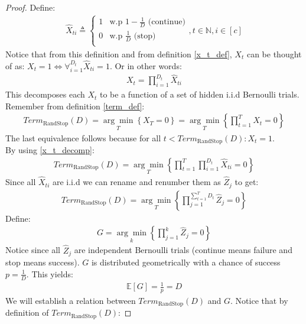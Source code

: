 \documentclass{article}
\newcommand{\E}[1]{\mathbb{E} \left[ #1 \right]}
\newcommand{\argmin}[2]{\underset{#1}{\arg \min} \left\{ #2 \right\}}
\newcommand{\N}{\mathbb{N}}
\newcommand{\termaux}{\textit{Term}_\text{RandStop}}
\begin{document}
\begin{proof}
    Define:
    \begin{gather*}
    \hat{X}_{ti} \triangleq
        \begin{cases}
            1 & \text{w.p } 1 -\frac{1}{D} \text{ (continue)} \\
            0 & \text{w.p } \frac{1}{D} \text{ (stop)} \\
        \end{cases},
        t \in \N, i \in [c]
    \end{gather*}
    Notice that from this definition and from definition \ref{x_t_def}, $X_t$ can be thought of as: $X_t = 1 \iff \forall_{i=1}^{D_t} \hat{X}_{ti} = 1$. Or in other words:
    \begin{gather}\label{x_t_decomp}
        X_t = \prod\limits_{i=1}^{D_t} \hat{X}_{ti}
    \end{gather}
    This decomposes each $X_t$ to be a function of a set of hidden i.i.d Bernoulli trials.
    Remember from definition \ref{term_def}:
    \begin{gather*}
        \termaux(D) = \argmin{T}{X_T = 0} = \argmin{T}{\prod\limits_{t=1}^T X_t = 0}
    \end{gather*}
    The last equivalence follows because for all $t < \termaux(D): X_t = 1$.\\
    By using \eqref{x_t_decomp}:
    \begin{gather*}
        \termaux(D) = \argmin{T}{\prod\limits_{t=1}^T \prod\limits_{i=1}^{D_t} \hat{X}_{ti} = 0}
    \end{gather*}
    Since all $\hat{X}_{ti}$ are i.i.d we can rename and renumber them as $\hat{Z}_j$ to get:
    \begin{gather*}
        \termaux(D) = \argmin{T}{\prod\limits_{j=1}^{\sum\limits_{t=1}^T D_t} \hat{Z}_j = 0}
    \end{gather*}
    Define:
    \begin{gather*}
        G = \argmin{k}{\prod\limits_{j=1}^{k} \hat{Z}_j= 0}
    \end{gather*}
    Notice since all $\hat{Z}_j$ are independent Bernoulli trials (continue means failure and stop means success). $G$ is distributed geometrically with a chance of success $p = \frac{1}{D}$. This yields:
    \begin{gather}\label{g_mean}
        \E{G} = \frac{1}{p} = D
    \end{gather}
    We will establish a relation between $\termaux(D)$ and $G$. Notice that by definition of $\termaux(D)$:

\end{proof}
\end{document}

